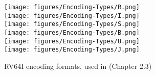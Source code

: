 \begin{figure}[t]
    \begin{centering}
        \texttt{[image: figures/Encoding-Types/R.png]}\\
        \texttt{[image: figures/Encoding-Types/I.png]}\\
        \texttt{[image: figures/Encoding-Types/S.png]}\\
        \texttt{[image: figures/Encoding-Types/B.png]}\\
        \texttt{[image: figures/Encoding-Types/U.png]}\\
        \texttt{[image: figures/Encoding-Types/J.png]}
        \caption[RV64I encoding formats]{RV64I encoding formats, used in \cite{riscv-isa}(Chapter 2.3) }
        \label{fig:rv64i_formats}
    \end{centering}
\end{figure}
